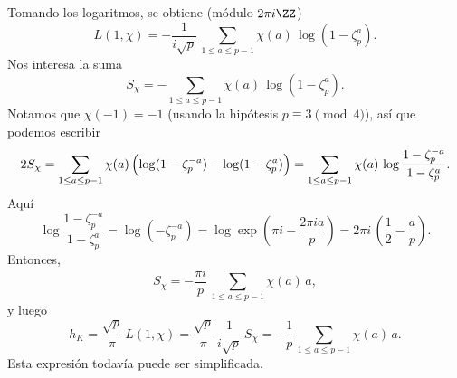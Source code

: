 Tomando los logaritmos, se obtiene (módulo $2\pi i\ZZ$)
$$L(1,\chi) = -\frac{1}{i\sqrt{p}}\,\sum_{1 \le a \le p-1} \chi (a)\,\log (1 - \zeta_p^a).$$
Nos interesa la suma
$$S_\chi = -\sum_{1 \le a \le p-1} \chi (a)\,\log (1 - \zeta_p^a).$$
Notamos que $\chi (-1) = -1$ (usando la hipótesis $p \equiv 3 \pmod{4}$),
así que podemos escribir
\[ 2 S_\chi = \sum_{1 \le a \le p-1} \chi (a)\,\Bigl(\log (1 - \zeta_p^{-a}) - \log (1 - \zeta_p^a)\Bigr) =
   \sum_{1 \le a \le p-1} \chi (a)\,\log \frac{1 - \zeta_p^{-a}}{1 - \zeta_p^a}. \]
Aquí
\[ \log \frac{1 - \zeta_p^{-a}}{1 - \zeta_p^a} =
   \log (-\zeta_p^{-a}) =
   \log \exp \left(\pi i - \frac{2\pi i a}{p}\right) =
   2\pi i\,\left(\frac{1}{2} - \frac{a}{p}\right). \]
Entonces,
$$S_\chi = -\frac{\pi i}{p}\,\sum_{1 \le a \le p-1} \chi (a)\,a,$$
y luego
\[ h_K = \frac{\sqrt{p}}{\pi}\,L(1,\chi) =
   \frac{\sqrt{p}}{\pi}\,\frac{1}{i\sqrt{p}}\,S_\chi =
   -\frac{1}{p}\,\sum_{1 \le a \le p-1} \chi (a)\,a. \]
Esta expresión todavía puede ser simplificada.

